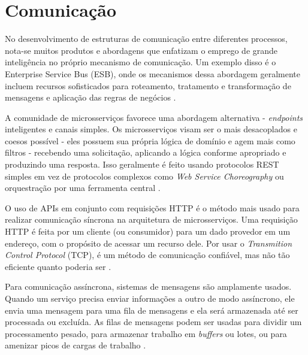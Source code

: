 

\section{Comunicação}\label{secao-comunicacao}


No desenvolvimento de estruturas de comunicação entre diferentes processos, nota-se muitos produtos e abordagens que enfatizam o emprego de grande inteligência no próprio mecanismo de comunicação. Um exemplo disso é o Enterprise Service Bus (ESB), onde os mecanismos dessa abordagem geralmente incluem recursos sofisticados para roteamento, tratamento e transformação de mensagens e aplicação das regras de negócios \cite{martin-fowler-microservices}.

A comunidade de microsserviços favorece uma abordagem alternativa - \emph{endpoints} inteligentes e canais simples. Os microsserviços visam ser o mais desacoplados e coesos possível - eles possuem sua própria lógica de domínio e agem mais como filtros - recebendo uma solicitação, aplicando a lógica conforme apropriado e produzindo uma resposta. Isso geralmente é feito usando protocolos REST simples em vez de protocolos complexos como \emph{Web Service Choreography} ou orquestração por uma ferramenta central \cite{martin-fowler-microservices}.

O uso de APIs em conjunto com requisições HTTP é o método mais usado para realizar comunicação síncrona na arquitetura de microsserviços. Uma requisição HTTP é feita por um cliente (ou consumidor) para um dado provedor em um endereço, com o propósito de acessar um recurso dele. Por usar o \emph{Transmition Control Protocol} (TCP), é um método de comunicação confiável, mas não tão eficiente quanto poderia ser \cite{martin-fowler-microservices}.

Para comunicação assíncrona, sistemas de mensagens são amplamente usados. Quando um serviço precisa enviar informações a outro de modo assíncrono, ele envia uma mensagem para uma fila de mensagens e ela será armazenada até ser processada ou excluída. As filas de mensagens podem ser usadas para dividir um processamento pesado, para armazenar trabalho em \emph{buffers} ou lotes, ou para amenizar picos de cargas de trabalho \cite{amazon-filas-de-mensagens}.

